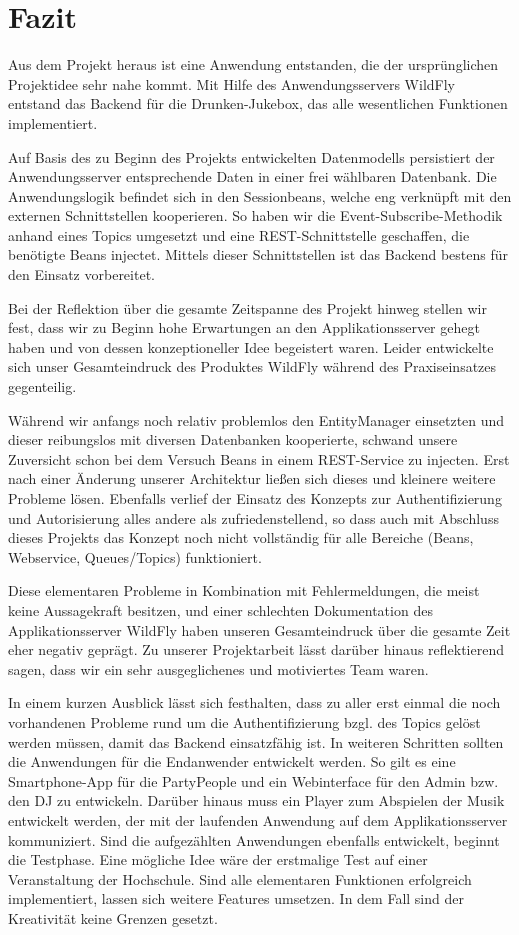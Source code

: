 \section{Fazit}
Aus dem Projekt heraus ist eine Anwendung entstanden, die der ursprünglichen Projektidee sehr nahe kommt. Mit Hilfe des Anwendungsservers WildFly entstand das Backend für die Drunken-Jukebox, das alle wesentlichen Funktionen implementiert.

Auf Basis des zu Beginn des Projekts entwickelten Datenmodells persistiert der Anwendungsserver entsprechende Daten in einer frei wählbaren Datenbank. Die Anwendungslogik befindet sich in den Sessionbeans, welche eng verknüpft mit den externen Schnittstellen kooperieren. So haben wir die Event-Subscribe-Methodik anhand eines Topics umgesetzt und eine REST-Schnittstelle geschaffen, die benötigte Beans injectet. Mittels dieser Schnittstellen ist das Backend bestens für den Einsatz vorbereitet. 

Bei der Reflektion über die gesamte Zeitspanne des Projekt hinweg stellen wir fest, dass wir zu Beginn hohe Erwartungen an den Applikationsserver gehegt haben und von dessen konzeptioneller Idee begeistert waren. Leider entwickelte sich unser Gesamteindruck des Produktes WildFly während des Praxiseinsatzes gegenteilig. 

Während wir anfangs noch relativ problemlos den EntityManager einsetzten und dieser reibungslos mit diversen Datenbanken kooperierte, schwand unsere Zuversicht schon bei dem Versuch Beans in einem REST-Service zu injecten. Erst nach einer Änderung unserer Architektur ließen sich dieses und kleinere weitere Probleme lösen. Ebenfalls verlief der Einsatz des Konzepts zur Authentifizierung und Autorisierung alles andere als zufriedenstellend, so dass auch mit Abschluss dieses Projekts das Konzept noch nicht vollständig für alle Bereiche (Beans, Webservice, Queues/Topics) funktioniert.

Diese elementaren Probleme in Kombination mit Fehlermeldungen, die meist keine Aussagekraft besitzen, und einer schlechten Dokumentation des Applikationsserver WildFly haben unseren Gesamteindruck über die gesamte Zeit eher negativ geprägt. Zu unserer Projektarbeit lässt darüber hinaus reflektierend sagen, dass wir ein sehr ausgeglichenes und motiviertes Team waren. 

In einem kurzen Ausblick lässt sich festhalten, dass zu aller erst einmal die noch vorhandenen Probleme rund um die Authentifizierung bzgl. des Topics gelöst werden müssen, damit das Backend einsatzfähig ist. In weiteren Schritten sollten die Anwendungen für die Endanwender entwickelt werden. So gilt es eine Smartphone-App für die PartyPeople und ein Webinterface für den Admin bzw. den DJ zu entwickeln. Darüber hinaus muss ein Player zum Abspielen der Musik entwickelt werden, der mit der laufenden Anwendung auf dem Applikationsserver kommuniziert.
Sind die aufgezählten Anwendungen ebenfalls entwickelt, beginnt die Testphase. Eine mögliche Idee wäre der erstmalige Test auf einer Veranstaltung der Hochschule. Sind alle elementaren Funktionen erfolgreich implementiert, lassen sich weitere Features umsetzen. In dem Fall sind der Kreativität keine Grenzen gesetzt.
